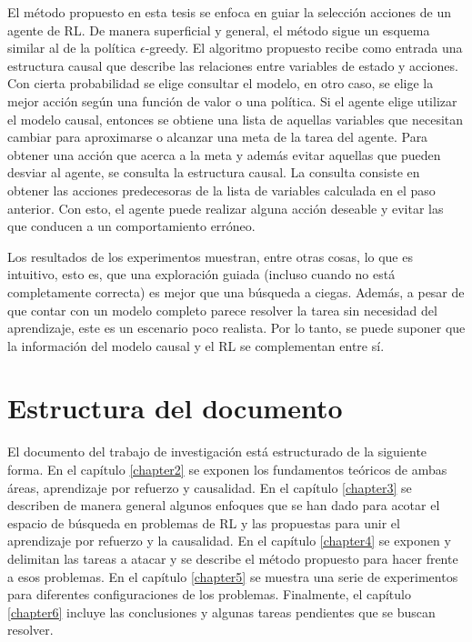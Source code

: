 El método propuesto en esta tesis se enfoca en guiar la
selección acciones de un agente de RL. De manera superficial y general, el método sigue un esquema similar al de la política $\epsilon$-greedy.
El algoritmo propuesto recibe como entrada una estructura causal que describe las relaciones entre variables de estado y acciones.
Con cierta probabilidad se elige consultar el modelo, en otro caso, se elige la mejor acción según una función de valor o una política. 
Si el agente elige utilizar el modelo causal, entonces se obtiene una lista de aquellas variables que necesitan cambiar para aproximarse o alcanzar una meta de la tarea del agente. Para obtener una acción que acerca a la meta y además evitar aquellas que pueden desviar al agente, se consulta la estructura causal. La consulta consiste en obtener las acciones predecesoras de la lista de variables calculada en el paso anterior. Con esto, 
el agente puede realizar alguna acción deseable y evitar las que conducen a un comportamiento erróneo.

Los resultados de los experimentos muestran, entre otras cosas, lo que es intuitivo, esto es, que una exploración guiada (incluso cuando no está completamente correcta) es mejor que una búsqueda a ciegas. Además, a pesar de que contar con un modelo completo parece resolver la tarea sin necesidad del aprendizaje, este es un escenario poco realista. Por lo tanto, se puede suponer que la información del modelo causal y el RL se complementan entre sí.

\section{Estructura del documento}

El documento del trabajo de investigación está estructurado de la 
siguiente forma.
En el capítulo \ref{chapter2} se exponen los fundamentos teóricos de ambas áreas, aprendizaje por refuerzo y causalidad.
En el capítulo \ref{chapter3} se describen de manera general algunos enfoques
que se han dado para acotar el espacio de búsqueda en problemas
de RL y las propuestas para unir el aprendizaje por refuerzo y
la causalidad. En el capítulo \ref{chapter4} se exponen y
delimitan las tareas a atacar y se describe el método propuesto para hacer frente a esos problemas. En el capítulo \ref{chapter5} se muestra una serie de experimentos
para diferentes configuraciones de los problemas. Finalmente,
el capítulo \ref{chapter6} incluye las conclusiones y algunas tareas pendientes que se buscan resolver.
